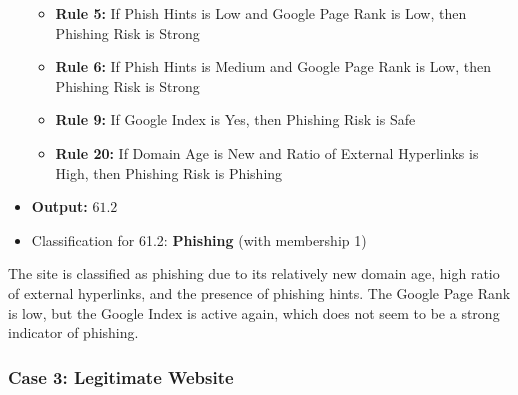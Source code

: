 \documentclass[11pt]{article}
\begin{document}
\begin{itemize}
    \begin{itemize}
        \item \textbf{Rule 5:} If Phish Hints is Low and Google Page Rank is Low, then Phishing Risk is Strong
        \item \textbf{Rule 6:} If Phish Hints is Medium and Google Page Rank is Low, then Phishing Risk is Strong
        \item \textbf{Rule 9:} If Google Index is Yes, then Phishing Risk is Safe
        \item \textbf{Rule 20:} If Domain Age is New and Ratio of External Hyperlinks is High, then Phishing Risk is Phishing
    \end{itemize}
    \item \textbf{Output:} $61.2$
    \item Classification for 61.2: \textbf{Phishing} (with membership 1)
\end{itemize}

The site is classified as phishing due to its relatively new domain age, high ratio of external hyperlinks, and the presence of phishing hints. The Google Page Rank is low, but the Google Index is active again, which does not seem to be a strong indicator of phishing.

\subsubsection{Case 3: Legitimate Website}
\end{document}

